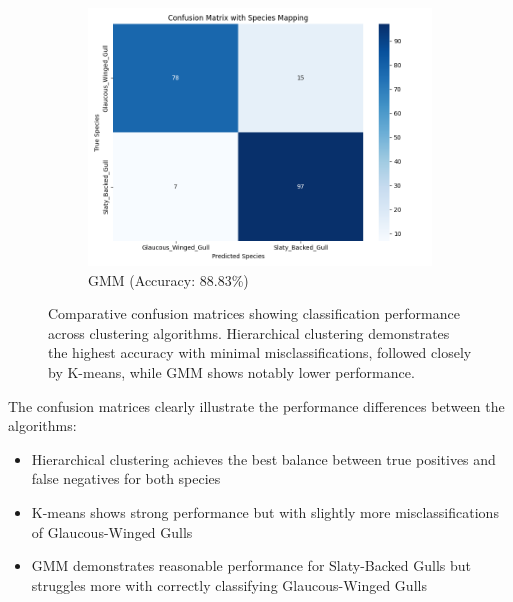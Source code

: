 \documentclass[a4paper,12pt]{report}
\begin{document}
\begin{figure}[H]
    \hfill
    \begin{subfigure}[b]{0.32\textwidth}
        \centering
        \includegraphics[width=\textwidth]{images/clustering/gmm_confusion_matrix.png}
        \caption{GMM (Accuracy: 88.83\%)}
        \label{fig:gmm_cm}
    \end{subfigure}
    \caption{Comparative confusion matrices showing classification performance across clustering algorithms. Hierarchical clustering demonstrates the highest accuracy with minimal misclassifications, followed closely by K-means, while GMM shows notably lower performance.}
    \label{fig:confusion_matrices}
\end{figure}

The confusion matrices clearly illustrate the performance differences between the algorithms:
\begin{itemize}
    \item Hierarchical clustering achieves the best balance between true positives and false negatives for both species
    \item K-means shows strong performance but with slightly more misclassifications of Glaucous-Winged Gulls
    \item GMM demonstrates reasonable performance for Slaty-Backed Gulls but struggles more with correctly classifying Glaucous-Winged Gulls
\end{itemize}

\end{document}
